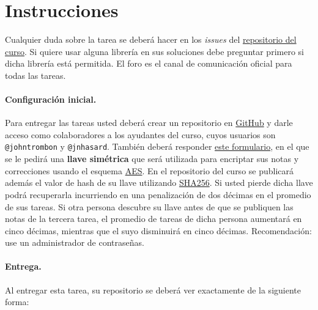
\section*{Instrucciones}

Cualquier duda sobre la tarea se deberá hacer en los \emph{issues} del \href{https://github.com/UC-IIC3253/2022}{repositorio del curso}. Si quiere usar alguna librería en sus soluciones debe preguntar primero si dicha librería está permitida. El foro es el canal de comunicación oficial para todas las tareas.

\paragraph{Configuración inicial.} Para entregar las tareas usted deberá crear un repositorio en \href{https://github.com}{GitHub} y darle acceso como colaboradores a los ayudantes del curso, cuyos usuarios son \texttt{@johntrombon} y \texttt{@jnhasard}. También deberá responder \href{https://docs.google.com/forms/d/e/1FAIpQLScf4rDsePbU20UyzUxsD6lOi1SU_gOc5c6kQv39E2cPCrmwpQ/viewform?usp=sf_link}{este formulario}, en el que se le pedirá una \textbf{llave simétrica} que será utilizada para encriptar sus notas y correcciones usando el esquema \href{https://en.wikipedia.org/wiki/Advanced_Encryption_Standard}{AES}. En el repositorio del curso se publicará además el valor de hash de su llave utilizando \href{https://en.wikipedia.org/wiki/SHA-2}{SHA256}. Si usted pierde dicha llave podrá recuperarla incurriendo en una penalización de dos décimas en el promedio de sus tareas. Si otra persona descubre su llave antes de que se publiquen las notas de la tercera tarea, el promedio de tareas de dicha persona aumentará en cinco décimas, mientras que el suyo disminuirá en cinco décimas. Recomendación: use un administrador de contraseñas.

\paragraph{Entrega.} Al entregar esta tarea, su repositorio se deberá ver exactamente de la siguiente forma:

\bigskip



